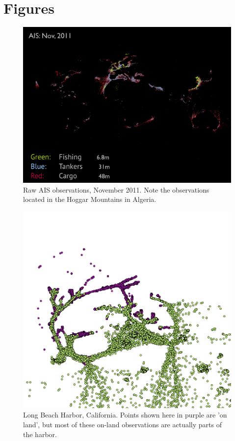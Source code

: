 \appendix{}
\gdef\thesection{Appendix \Alph{section}}

\section{Figures}
\label{sec:figures}

\begin{figure}[htbp]
  \centering
  \includegraphics[width=160mm]{figures/ais-nov-2011.pdf}
  \caption{Raw AIS observations, November 2011. Note the observations located in the Hoggar Mountains in Algeria.}
  \label{fig:ais-obs-nov-2011}
\end{figure}

\begin{figure}[htbp]
  \centering
  \includegraphics[width=140mm]{images/example-long-beach-harbor-validation.png}
  \caption{Long Beach Harbor, California. Points shown here in purple are 'on land', but most of these on-land observations are actually parts of the harbor.}
  \label{fig:longbeach-validation}
\end{figure}


